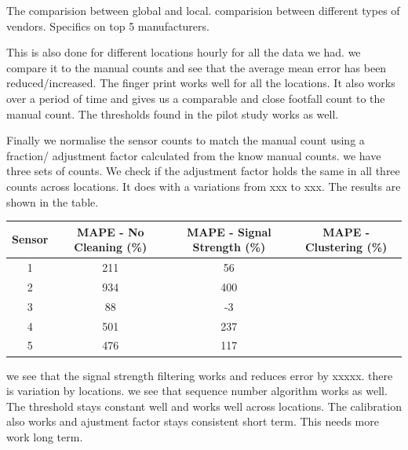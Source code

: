 The comparision between global and local.
comparision between different types of vendors.
Specifics on top 5 manufacturers.

This is also done for different locations hourly for all the data we had.
we compare it to the manual counts and see that the average mean error
has been reduced/increased. The finger print works well for all the locations.
It also works over a period of time and gives us a comparable and close 
footfall count to the manual count. The thresholds found in the pilot study
works as well.

Finally we normalise the sensor counts to match the manual count using
a fraction/ adjustment factor calculated from the know manual counts.
we have three sets of counts. We check if the adjustment factor holds the
same in all three counts across locations. It does with a variations from
xxx to xxx. The results are shown in the table. 


\begin{table}
	{\begin{tabular}{cccc} 
		\toprule
			Sensor& MAPE - No Cleaning (\%)&MAPE - Signal Strength (\%)&MAPE - Clustering (\%)\\
		 \midrule
			1 & 211 &  56 & \\
			2 & 934 & 400 & \\
			3 &  88 &  -3 & \\
			4 & 501 & 237 & \\
			5 & 476 & 117 & \\
		 \bottomrule
	\end{tabular}}
	\label{errors-table}
\end{table}


we see that the signal strength filtering works and reduces error by
xxxxx. there is variation by locations.
we see that sequence number algorithm works as well. The threshold stays
constant well and works well across locations. The calibration also works
and ajustment factor stays consistent short term. This needs more work 
long term.
